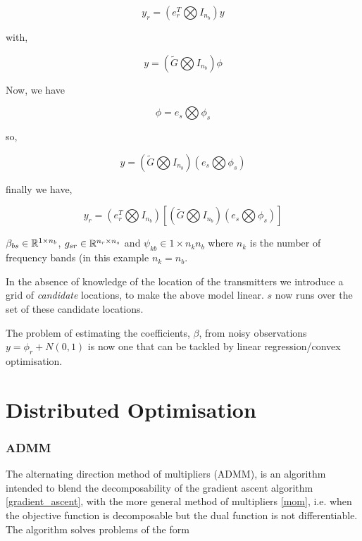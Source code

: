 \documentclass{article}
\begin{document}
\begin{equation}
y_r = \left(	e_r^T \bigotimes I_{n_b}\right) y
\end{equation}

with,

\begin{equation}
y = \left( \tilde{G} \bigotimes I_{n_b} \right) \phi
\end{equation}

Now, we have

\begin{equation}
\phi = e_s \bigotimes \phi_s
\end{equation}

so,

\begin{equation}
y = \left( \tilde{G} \bigotimes I_{n_b} \right) \left(e_s \bigotimes \phi_s \right)
\end{equation}

finally we have,

\begin{equation}
y_r = \left(	e_r^T \bigotimes I_{n_b}\right)\left[\left( \tilde{G} \bigotimes I_{n_b} \right) \left(e_s \bigotimes \phi_s \right)\right]
\end{equation}

\(\beta_{bs} \in {\mathbb{R}}^{1 \times n_b}\), \(g_{sr} \in {\mathbb{R}}^{n_r \times n_s}\) and \(\psi_{kb} \in 1 \times n_k n_b\) where \(n_k\) is the number of frequency bands (in this example \(n_k = n_b\).

In the absence of knowledge of the location of the transmitters we introduce a grid of \textit{candidate} locations, to make the above model linear. \(s\) now runs over the set of these candidate locations.

The problem of estimating the coefficients, \(\beta\), from noisy observations \(y = \phi_r + N\left(0,1\right)\) is now one that can be tackled by linear regression/convex optimisation.


\section{Distributed Optimisation}

\subsubsection{ADMM}
The alternating direction method of multipliers (ADMM), is an algorithm intended to blend the decomposability of the gradient ascent algorithm \ref{gradient_ascent}, with the more general method of multipliers \ref{mom}, i.e. when the objective function is decomposable but the dual function is not differentiable. The algorithm solves problems of the form
\end{document}
